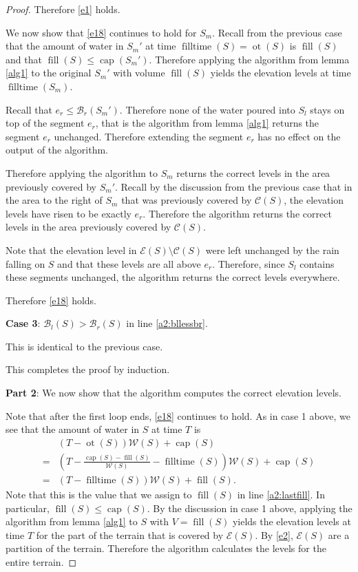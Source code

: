 \documentclass[11pt,a4paper]{article}
\DeclareMathOperator{\capp}{cap}
\DeclareMathOperator{\ot}{ot}
\DeclareMathOperator{\Fill}{fill}
\DeclareMathOperator{\filltime}{filltime}
\begin{document}
\begin{proof}
Therefore \ref{e1} holds.

We now show that \ref{e18} continues to hold for $S_m$.
Recall from the previous case that the amount of water in $S_m'$ at time $\filltime(S) = \ot(S)$ is $\Fill(S)$ and that $\Fill(S)\le\capp(S_m')$.
Therefore applying the algorithm from lemma \ref{alg1} to the original $S_m'$ with volume $\Fill(S)$ yields the elevation levels at time $\filltime(S_m)$.

Recall that $e_r\le\mathcal{B}_r(S_m')$.
Therefore none of the water poured into $S_l$ stays on top of the segment $e_r$, that is the algorithm from lemma \ref{alg1} returns the segment $e_r$ unchanged.
Therefore extending the segment $e_r$ has no effect on the output of the algorithm.

Therefore applying the algorithm to $S_m$ returns the correct levels in the area previously covered by $S_m'$.
Recall by the discussion from the previous case that in the area to the right of $S_m$ that was previously covered by $\mathcal{C}(S)$, the elevation levels have risen to be exactly $e_r$.
Therefore the algorithm returns the correct levels in the area previously covered by $\mathcal{C}(S)$.

Note that the elevation level in $\mathcal{E}(S)\setminus\mathcal{C}(S)$ were left unchanged by the rain falling on $S$ and that these levels are all above $e_r$.
Therefore, since $S_l$ contains these segments unchanged, the algorithm returns the correct levels everywhere.

Therefore \ref{e18} holds.

\textbf{Case 3}: $\mathcal{B}_l(S) > \mathcal{B}_r(S)$ in line \ref{a2:bllessbr}.

This is identical to the previous case.

This completes the proof by induction.

\textbf{Part 2}: We now show that the algorithm computes the correct elevation levels.

Note that after the first loop ends, \ref{e18} continues to hold.
As in case 1 above, we see that the amount of water in $S$ at time $T$ is
\begin{align*}
    &(T - \ot(S))\mathcal{W}(S) + \capp(S) \\
  = &\left(T - \frac{\capp(S) - \Fill(S)}{\mathcal{W}(S)} - \filltime(S)\right)\mathcal{W}(S) + \capp(S) \\
  = &\left(T - \filltime(S)\right)\mathcal{W}(S) + \Fill(S).
\end{align*}
Note that this is the value that we assign to $\Fill(S)$ in line \ref{a2:lastfill}.
In particular, $\Fill(S)\le\capp(S)$.
By the discussion in case 1 above, applying the algorithm from lemma \ref{alg1} to $S$ with $V=\Fill(S)$ yields the elevation levels at time $T$ for the part of the terrain that is covered by $\mathcal{E}(S)$.
By \ref{e2}, $\mathcal{E}(S)$ are a partition of the terrain.
Therefore the algorithm calculates the levels for the entire terrain.


\end{proof}
\end{document}
